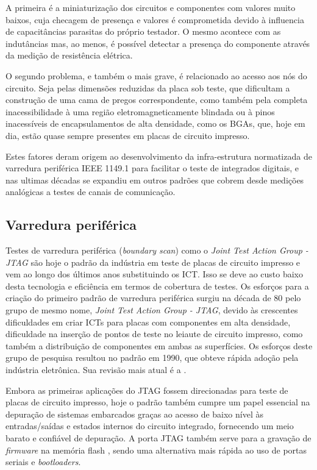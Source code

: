 A primeira é a miniaturização dos circuitos e componentes com valores muito baixos, cuja checagem de presença e valores é comprometida  devido à influencia de capacitâncias parasitas do próprio testador. O mesmo acontece com as indutâncias mas, ao menos, é possível detectar a presença do componente através da medição de resistência elétrica.

O segundo problema, e também o mais grave, é relacionado ao acesso aos nós do circuito. Seja pelas dimensões reduzidas da placa sob teste, que dificultam a construção de uma cama de pregos correspondente, como também pela completa inacessibilidade à uma região eletromagneticamente blindada ou à pinos inacessíveis de encapsulamentos de alta densidade, como os BGAs, que, hoje em dia, estão quase sempre presentes em placas de circuito impresso.

Estes fatores deram origem ao desenvolvimento da infra-estrutura normatizada de varredura periférica IEEE 1149.1 \citep{ieee11491old} para facilitar o teste de integrados digitais, e nas ultimas décadas se expandiu em outros padrões que cobrem desde medições analógicas a testes de canais de comunicação. 

\subsection{Varredura periférica}

Testes de varredura periférica (\textit{boundary scan}) como o \textit{Joint Test Action Group - JTAG} são hoje o padrão da indústria em teste de placas de circuito impresso e vem ao longo dos últimos anos substituindo os ICT. Isso se deve ao custo baixo desta tecnologia e eficiência em termos de cobertura de testes.
Os esforços para a criação do primeiro padrão de varredura periférica surgiu na década de 80 pelo grupo de mesmo nome, \textit{Joint Test Action Group - JTAG}, devido às crescentes dificuldades em criar ICTs para placas com componentes em alta densidade, dificuldade na inserção de pontos de teste no leiaute de circuito impresso, como também a distribuição de componentes em ambas as superfícies. Os esforços deste grupo de pesquisa resultou no padrão \citet{ieee11491old} em 1990, que obteve rápida adoção pela indústria eletrônica. Sua revisão mais atual é a \citet{ieee11491yr2013}.



Embora as primeiras aplicações do JTAG fossem direcionadas para teste de placas de circuito impresso, hoje o padrão também cumpre um papel essencial na depuração de sistemas embarcados graças ao acesso de baixo nível às entradas/saídas e estados internos do circuito integrado, fornecendo um meio barato e confiável de depuração.
A porta JTAG também serve para a gravação de \textit{firmware} na memória flash \citep{ieee1532}, sendo uma alternativa mais rápida ao uso de portas seriais e \textit{bootloaders}. 

